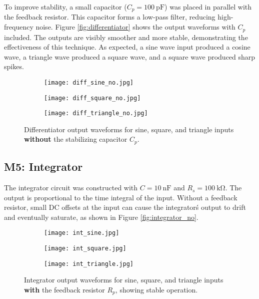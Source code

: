 \documentclass[12pt,a4paper]{article}
\begin{document}
To improve stability, a small capacitor (\(C_p = \SI{100}{\pico\farad}\)) was placed in parallel with the feedback resistor. This capacitor forms a low-pass filter, reducing high-frequency noise. Figure \ref{fig:differentiator} shows the output waveforms with \(C_p\) included. The outputs are visibly smoother and more stable, demonstrating the effectiveness of this technique. As expected, a sine wave input produced a cosine wave, a triangle wave produced a square wave, and a square wave produced sharp spikes.

\begin{figure}[H]
    \centering
    \begin{subfigure}[b]{0.32\linewidth}
        \texttt{[image: diff\_sine\_no.jpg]} 
    \end{subfigure}
    \begin{subfigure}[b]{0.32\linewidth}
        \texttt{[image: diff\_square\_no.jpg]} 
    \end{subfigure}
    \begin{subfigure}[b]{0.32\linewidth}
        \texttt{[image: diff\_triangle\_no.jpg]} 
    \end{subfigure}
    \caption{Differentiator output waveforms for sine, square, and triangle inputs \textbf{without} the stabilizing capacitor \(C_p\).}
    \label{fig:differentiator_no}
\end{figure}


\subsection{M5: Integrator}
The integrator circuit was constructed with \(C = \SI{10}{\nano\farad}\) and \(R_s = \SI{100}{\kilo\ohm}\). The output is proportional to the time integral of the input. Without a feedback resistor, small DC offsets at the input can cause the integrator\'s output to drift and eventually saturate, as shown in Figure \ref{fig:integrator_no}.

\begin{figure}[H]
    \centering
    \begin{subfigure}[b]{0.32\linewidth}
        \texttt{[image: int\_sine.jpg]} 
    \end{subfigure}
    \begin{subfigure}[b]{0.32\linewidth}
        \texttt{[image: int\_square.jpg]} 
    \end{subfigure}
    \begin{subfigure}[b]{0.32\linewidth}
        \texttt{[image: int\_triangle.jpg]} 
    \end{subfigure}
    \caption{Integrator output waveforms for sine, square, and triangle inputs \textbf{with} the feedback resistor \(R_p\), showing stable operation.}
    \label{fig:integrator_}
\end{figure}
\end{document}
